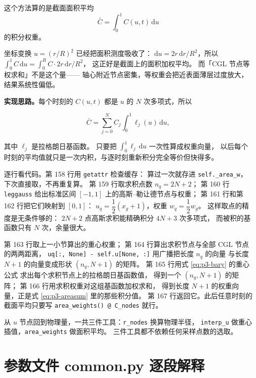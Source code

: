 这个方法算的是截面面积平均
\begin{equation}
\bar C=\int_0^1 C(u,t)\,\mathrm{d}u
\label{eq:p3-area}
\end{equation}
的积分权重。

坐标变换 $u=(r/R)^2$ 已经把面积测度吸收了：
$\mathrm{d}u=2r\,\mathrm{d}r/R^2$，所以
$\int_0^1C\,\mathrm{d}u=\int_0^RC\cdot2r\,\mathrm{d}r/R^2$，
这正好是截面上的面积加权平均。
而「CGL 节点等权求和」不是这个量——
轴心附近节点密集，等权重会把近表面薄层过度放大，结果系统性偏低。

\textbf{实现思路。}每个时刻的 $C(u,t)$ 都是 $u$ 的 $N$ 次多项式，所以

\begin{equation}
\bar C=\sum_{j=0}^{N}C_j\int_0^1\ell_j(u)\,\mathrm{d}u ,
\label{eq:p3-areasum}
\end{equation}

其中 $\ell_j$ 是拉格朗日基函数。
只要把 $\int_0^1\ell_j\,\mathrm{d}u$ 一次性算成权重向量，
以后每个时刻的平均值就只是一次内积，与逐时刻重新积分完全等价但快得多。

逐行看代码。第 158 行用 \texttt{getattr} 检查缓存：
算过一次就存进 \texttt{self.\_area\_w}，下次直接取，不再重复算。
第 159 行取求积点数 $n_q=2N+2$；
第 160 行 \texttt{leggauss} 给出标准区间 $[-1,1]$ 上的高斯--勒让德节点与权重；
第 161 行和第 162 行把它们映射到 $[0,1]$：
$u_q=\dfrac{1}{2}(x_g+1)$，权重 $w_q=\dfrac{1}{2}w_g$。
这样取点的精度是无条件够的：
$2N+2$ 点高斯求积能精确积分 $4N+3$ 次多项式，
而被积的基函数只有 $N$ 次，余量很大。

第 163 行取上一小节算出的重心权重；
第 164 行算出求积节点与全部 CGL 节点的两两距离，
\texttt{uq[:, None] - self.u[None, :]} 用广播把长度 $n_q$ 的向量
与长度 $N+1$ 的向量变成形状 $(n_q,N+1)$ 的矩阵。
第 165 行用式 \eqref{eq:p3-bary} 的重心公式
求出每个求积节点上的拉格朗日基函数值，
得到一个 $(n_q,N+1)$ 的矩阵；
第 166 行用求积权重对这组基函数加权求和，
得到长度 $N+1$ 的权重向量，正是式 \eqref{eq:p3-areasum} 里的那些积分值。
第 167 行返回它。此后任意时刻的截面平均只要写
\texttt{area\_weights() @ C\_nodes} 就行。

\keypoint
从 $u$ 节点回到物理量，一共三件工具：\texttt{r\_nodes} 换算物理半径，
\texttt{interp\_u} 做重心插值，\texttt{area\_weights} 做面积平均。
三件工具都不依赖任何采样点数的选取。

\section{参数文件 common.py 逐段解释}

